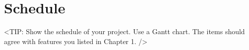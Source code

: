 

\section{Schedule}
\label{section:schedule}
<TIP: Show the schedule of your project.
Use a Gantt chart. The items should agree with features
you listed in Chapter 1. />

